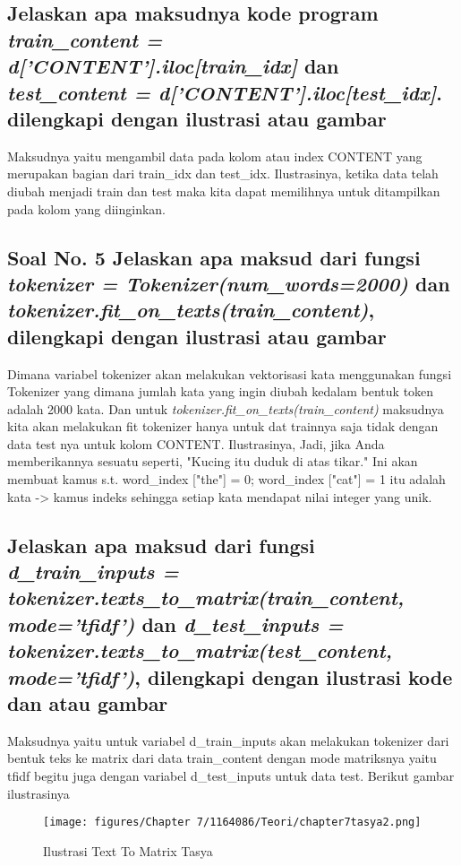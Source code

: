 \subsection{Jelaskan apa maksudnya kode program \emph{train\_content = d['CONTENT'].iloc[train\_idx]} dan \emph{test\_content = d['CONTENT'].iloc[test\_idx]}. dilengkapi dengan ilustrasi atau gambar}

Maksudnya yaitu mengambil data pada kolom atau index CONTENT yang merupakan bagian dari train\_idx dan test\_idx. Ilustrasinya, ketika data telah diubah menjadi train dan test maka kita dapat memilihnya untuk ditampilkan pada kolom yang diinginkan.

\subsection{Soal No. 5 Jelaskan apa maksud dari fungsi \emph{tokenizer = Tokenizer(num\_words=2000)} dan \emph{tokenizer.fit\_on\_texts(train\_content)}, dilengkapi dengan ilustrasi atau gambar} 
Dimana variabel tokenizer akan melakukan vektorisasi kata menggunakan fungsi Tokenizer yang dimana jumlah kata yang ingin diubah kedalam bentuk token adalah 2000 kata. Dan untuk \emph{tokenizer.fit\_on\_texts(train\_content)} maksudnya kita akan melakukan fit tokenizer hanya untuk dat trainnya saja tidak dengan data test nya untuk kolom CONTENT. Ilustrasinya, Jadi, jika Anda memberikannya sesuatu seperti, "Kucing itu duduk di atas tikar." Ini akan membuat kamus s.t. word\_index ["the"] = 0; word\_index ["cat"] = 1 itu adalah kata -> kamus indeks sehingga setiap kata mendapat nilai integer yang unik.

\subsection{Jelaskan apa maksud dari fungsi \emph{d\_train\_inputs = tokenizer.texts\_to\_matrix(train\_content, mode='tfidf')} dan \emph{d\_test\_inputs = tokenizer.texts\_to\_matrix(test\_content, mode='tfidf')}, dilengkapi dengan ilustrasi kode dan atau gambar} 


Maksudnya yaitu untuk variabel d\_train\_inputs akan melakukan tokenizer dari bentuk teks ke matrix dari data train\_content dengan mode matriksnya yaitu tfidf begitu juga dengan variabel d\_test\_inputs untuk data test. Berikut gambar ilustrasinya
\begin{figure}[ht]
\centering
\texttt{[image: figures/Chapter 7/1164086/Teori/chapter7tasya2.png]}
\caption{Ilustrasi Text To Matrix Tasya}
\label{Teori}
\end{figure}

